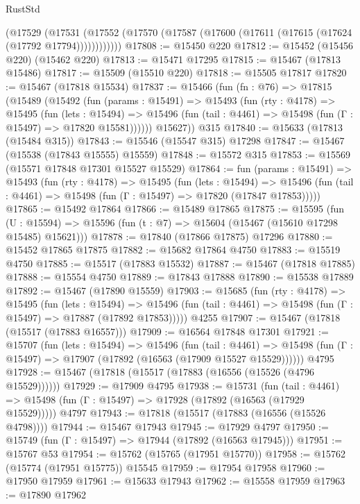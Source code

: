 \begin{lexlean}{RustStd}
\begin{coremodule}
        (@17529
          (@17531 (@17552 (@17570 (@17587 (@17600 (@17611 (@17615 (@17624 (@17792 @17794))))))))))))
@17808 := @15450 @220
@17812 := @15452 (@15456 @220) (@15462 @220)
@17813 := @15471 @17295
@17815 := @15467 (@17813 @15486)
@17817 := @15509 (@15510 @220)
@17818 := @15505 @17817
@17820 := @15467 (@17818 @15534)
@17837 := @15466
    (fun (fn : @76) =>
    @17815
      (@15489
        (@15492
          (fun (params : @15491) =>
          @15493
            (fun (rty : @4178) =>
            @15495
              (fun (lets : @15494) =>
              @15496 (fun (tail : @4461) => @15498 (fun (Γ : @15497) => @17820 @15581))))))
        @15627))
    @315
@17840 := @15633 (@17813 (@15484 @315))
@17843 := @15546 (@15547 @315) @17298
@17847 := @15467 (@15538 (@17843 @15555) @15559)
@17848 := @15572 @315
@17853 := @15569 (@15571 @17848 @17301 @15527 @15529)
@17864 := fun (params : @15491) =>
  @15493
    (fun (rty : @4178) =>
    @15495
      (fun (lets : @15494) =>
      @15496 (fun (tail : @4461) => @15498 (fun (Γ : @15497) => @17820 (@17847 @17853)))))
@17865 := @15492 @17864
@17866 := @15489 @17865
@17875 := @15595
    (fun (U : @15594) => @15596 (fun (t : @7) => @15604 (@15467 (@15610 @17298 @15485) @15621)))
@17878 := @17840 (@17866 @17875) @17296
@17880 := @15452 @17865 @17875
@17882 := @15682 @17864 @4750
@17883 := @15519 @4750
@17885 := @15517 (@17883 @15532)
@17887 := @15467 (@17818 @17885)
@17888 := @15554 @4750
@17889 := @17843 @17888
@17890 := @15538 @17889
@17892 := @15467 (@17890 @15559)
@17903 := @15685
    (fun (rty : @4178) =>
    @15495
      (fun (lets : @15494) =>
      @15496 (fun (tail : @4461) => @15498 (fun (Γ : @15497) => @17887 (@17892 @17853)))))
    @4255
@17907 := @15467 (@17818 (@15517 (@17883 @16557)))
@17909 := @16564 @17848 @17301
@17921 := @15707
    (fun (lets : @15494) =>
    @15496
      (fun (tail : @4461) =>
      @15498 (fun (Γ : @15497) => @17907 (@17892 (@16563 (@17909 @15527 @15529))))))
    @4795
@17928 := @15467 (@17818 (@15517 (@17883 (@16556 (@15526 (@4796 @15529))))))
@17929 := @17909 @4795
@17938 := @15731
    (fun (tail : @4461) => @15498 (fun (Γ : @15497) => @17928 (@17892 (@16563 (@17929 @15529)))))
    @4797
@17943 := @17818 (@15517 (@17883 (@16556 (@15526 @4798))))
@17944 := @15467 @17943
@17945 := @17929 @4797
@17950 := @15749 (fun (Γ : @15497) => @17944 (@17892 (@16563 @17945)))
@17951 := @15767 @53
@17954 := @15762 (@15765 (@17951 @15770))
@17958 := @15762 (@15774 (@17951 @15775)) @15545
@17959 := @17954 @17958
@17960 := @17950 @17959
@17961 := @15633 @17943
@17962 := @15558 @17959
@17963 := @17890 @17962

\end{coremodule}
\end{lexlean}
